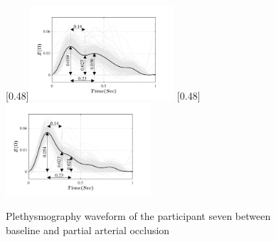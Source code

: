 \begin{figure}
	\centering
	\null\hfill%
	[0.48\textwidth]{\includegraphics[width=0.48\textwidth, trim={0.5cm 0cm 1.5cm 0 cm}, clip]{figure_apa_4a}}%
	\hfill%
	[0.48\textwidth]{\includegraphics[width=0.48\textwidth, trim={0.5cm 0cm 1.5cm 0 cm}, clip]{figure_apa_4b}}%
	\hfill\null%
	\caption{Plethysmography waveform of the participant seven between baseline and partial arterial occlusion}
	\label{fig:iPG arterial}
	
	\vspace{1cm}
	

\end{figure}
